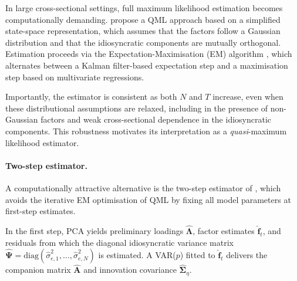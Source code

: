 In large cross-sectional settings, full maximum likelihood estimation becomes computationally demanding. \citet{doz2012quasi} propose a QML approach based on a simplified state-space representation, which assumes that the factors follow a Gaussian distribution and that the idiosyncratic components are mutually orthogonal. Estimation proceeds via the Expectation-Maximisation (EM) algorithm \citep{watson1983alternative}, which alternates between a Kalman filter-based expectation step and a maximisation step based on multivariate regressions.

Importantly, the estimator is consistent as both $N$ and $T$ increase, even when these distributional assumptions are relaxed, including in the presence of non-Gaussian factors and weak cross-sectional dependence in the idiosyncratic components. This robustness motivates its interpretation as a \textit{quasi}-maximum likelihood estimator.

\paragraph{Two-step estimator.}

A computationally attractive alternative is the two-step estimator of \citet{doz2011two}, which avoids the iterative EM optimisation of QML by fixing all model parameters at first-step estimates.

In the first step, PCA yields preliminary loadings $\hat{\boldsymbol{\Lambda}}$, factor estimates $\hat{\boldsymbol{f}}_t$, and residuals from which the diagonal idiosyncratic variance matrix $\hat{\boldsymbol{\Psi}} = \mathrm{diag}(\hat{\sigma}^2_{e,1}, \dots, \hat{\sigma}^2_{e,N})$ is estimated. A VAR($p$) fitted to $\hat{\boldsymbol{f}}_t$ delivers the companion matrix $\hat{\boldsymbol{A}}$ and innovation covariance $\hat{\boldsymbol{\Sigma}}_\eta$.

